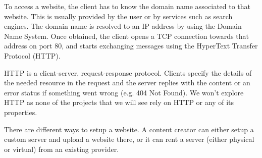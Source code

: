 \documentclass[mscthesis]{usiinfthesis}
\begin{document}
To access a website, the client has to know the domain name associated to that website. This is usually provided by the user or by services such as search engines. The domain name is resolved to an IP address by using the Domain Name System.
Once obtained, the client opens a TCP connection towards that address on port 80, and starts exchanging messages using the HyperText Transfer Protocol (HTTP). %

HTTP is a client-server, request-response protocol. Clients specify the details of the needed resource in the request and the server replies with the content or an error status if something went wrong (e.g. 404 Not Found). We won't explore HTTP as none of the projects that we will see rely on HTTP or any of its properties. %

There are different ways to setup a website. A content creator can either setup a custom server and upload a website there, or it can rent a server (either physical or virtual) from an existing provider.
\end{document}
